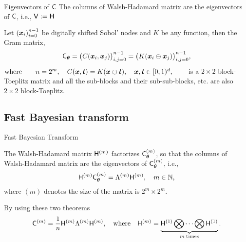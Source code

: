 \documentclass[handout, 10pt,compress,xcolor={usenames,dvipsnames}]{beamer} %
\newcommand{\bm}[1]{\boldsymbol{#1}}
\renewcommand{\mLambda}{\Lambda}
\newcommand{\mCtheta}{\mC_{\vtheta}}
\renewcommand{\vtheta}{{\bm{\theta}}}
\begin{document}
\begin{frame}{Eigenvectors of $\mathsf{C}$}
	\vspace{-2ex}
	The columns of Walsh-Hadamard matrix are the eigenvectors of $\mathsf{C}$, i.e., $\mathsf{V} := \mathsf{H}$
\begin{theorem}
	\label{thrm:block-toeplitz}
	Let $\left(\boldsymbol{x}_i\right)_{i=0}^{n-1}$ be digitally shifted Sobol' nodes and $K$ be any function,
	then the Gram matrix,
	\vspace{-1ex}
	$$
	\mCtheta = \bigl(C(\vx_i, \vx_j)\bigr)_{i,j=0}^{n-1} = \bigl(K(\vx_i \ominus \vx_j)\bigr)_{i,j=0}^{n-1},
	$$   
	$\text{where} \quad \quad n=2^m, \quad C(\boldsymbol{x}, \boldsymbol{t}) = K(\boldsymbol{x} \ominus \boldsymbol{t}), \quad  \boldsymbol{x}, \boldsymbol{t} \in [0,1)^d, \qquad
	$
	is a $2\times 2$ block-Toeplitz matrix and all the sub-blocks and their sub-sub-blocks, etc. are also $2\times 2$ block-Toeplitz. 
\end{theorem}


\end{frame}





\subsection{Fast Bayesian transform}


\begin{frame}{Fast Bayesian Transform}
	
	
	\begin{theorem}
		\label{thrm:hadamard_eigenvector}
		The Walsh-Hadamard matrix $\mathsf{H}^{(m)}$ factorizes $\mC_{\vtheta}^{(m)}$, so that the columns of Walsh-Hadamard matrix are the eigenvectors of $\mC_{\vtheta}^{(m)}$, i.e.,
		\vspace{-2ex}
		\begin{align*}
		\mH^{(m)} \mC_{\vtheta}^{(m)}  = \mLambda^{(m)} \mH^{(m)}, \quad m \in \naturals, 
		\end{align*}
		where $(m)$ denotes the size of the matrix is $2^m \times 2^m$.
	\end{theorem}

	By using these two theorems
	\begin{align}
	\label{eqn:hadamard_fwht}
	\mC^{(m)} = \frac{1}{n} \mH^{(m)} \mLambda^{(m)} \mH^{(m)}, \quad \text{where} \quad \mH^{({m})} = \underbrace{ \mH^{(1)} \bigotimes \cdots \bigotimes \mH^{(1)} }_{m \; \text{times}}.
	\end{align}
\end{frame}
\end{document}
